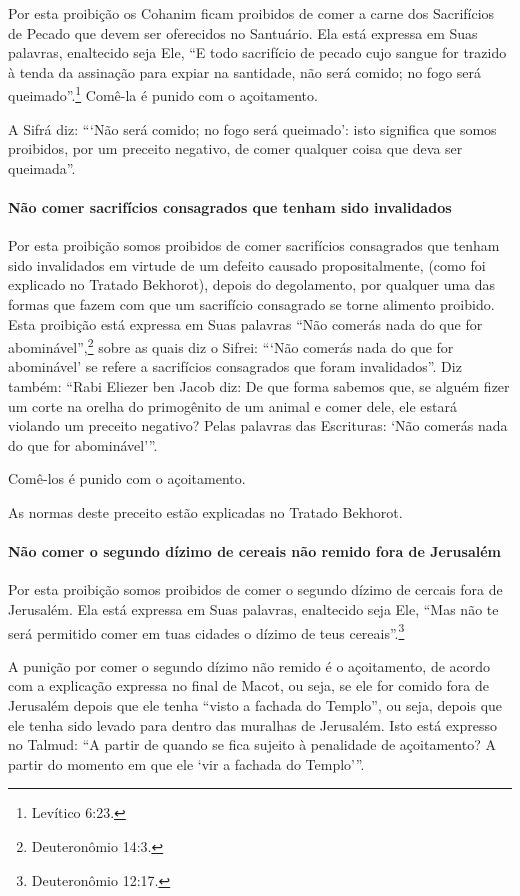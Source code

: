 Por esta proibição os Cohanim ficam proibidos de comer a carne dos
Sacrifícios de Pecado que devem ser oferecidos no Santuário. Ela está
expressa em Suas palavras, enaltecido seja Ele, ``E todo sacrifício de
pecado cujo sangue for trazido à tenda da assinação para expiar na
santidade, não será comido; no fogo será queimado''.\footnote{Levítico 6:23.}
Comê-la é punido com o açoitamento.

A Sifrá diz: ```Não será comido; no fogo será queimado': isto significa
que somos proibidos, por um preceito negativo, de comer qualquer coisa
que deva ser queimada''.

\paragraph{Não comer sacrifícios consagrados que tenham sido invalidados}

Por esta proibição somos proibidos de comer sacrifícios consagrados que
tenham sido invalidados em virtude de um defeito causado
propositalmente, (como foi explicado no Tratado Bekhorot), depois do
degolamento, por qualquer uma das formas que fazem com que um sacrifício consagrado se
torne alimento proibido. Esta proibição está expressa em Suas palavras
``Não comerás nada do que for abominável'',\footnote{Deuteronômio 14:3.} sobre
as quais diz o Sifrei: ```Não comerás nada do que for abominável' se
refere a sacrifícios consagrados que foram invalidados''. Diz também:
``Rabi Eliezer ben Jacob diz: De que forma sabemos que, se alguém fizer
um corte na orelha do primogênito de um animal e comer dele, ele estará
violando um preceito negativo? Pelas palavras das Escrituras: `Não
comerás nada do que for abominável'''.

Comê-los é punido com o açoitamento.

As normas deste preceito estão explicadas no Tratado Bekhorot.

\paragraph{Não comer o segundo dízimo de cereais não remido fora de Jerusalém}

Por esta proibição somos proibidos de comer o segundo dízimo de cercais
fora de Jerusalém. Ela está expressa em Suas palavras, enaltecido seja
Ele, ``Mas não te será permitido comer em tuas cidades o dízimo de teus
cereais''.\footnote{Deuteronômio 12:17.}

A punição por comer o segundo dízimo não remido é o açoitamento, de
acordo com a explicação expressa no final de Macot, ou seja, se ele for
comido fora de Jerusalém depois que ele tenha ``visto a fachada do
Templo'', ou seja, depois que ele tenha sido levado para dentro das
muralhas de Jerusalém. Isto está expresso no Talmud: ``A partir de
quando se fica sujeito à penalidade de açoitamento? A partir do momento
em que ele `vir a fachada do Templo'''.

